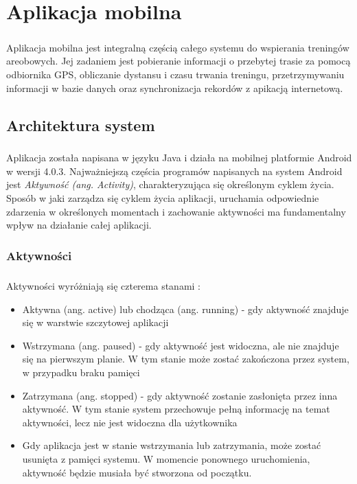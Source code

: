 \chapter{Aplikacja mobilna} %
\label{cha:aplikacja_mobilna}

\paragraph{} %
\label{par:}
Aplikacja mobilna jest integralną częścią całego systemu do wspierania treningów areobowych. Jej zadaniem jest pobieranie informacji o przebytej trasie za pomocą odbiornika GPS, obliczanie dystansu i czasu trwania treningu, przetrzymywaniu informacji w bazie danych oraz synchronizacja rekordów z apikacją internetową. 

\section{Architektura system} %
\label{sec:architektura_system}

\paragraph{} %
\label{par:}
Aplikacja została napisana w języku Java i działa na mobilnej platformie Android w wersji 4.0.3. Najważniejszą częścia programów napisanych na system Android jest \textit{Aktywność (ang. Activity)}, charakteryzująca się określonym cyklem życia. Sposób w jaki zarządza się cyklem życia aplikacji, uruchamia odpowiednie zdarzenia w określonych momentach i zachowanie aktywności ma fundamentalny wpływ na działanie całej aplikacji.

\subsection{Aktywności} %
\label{sub:aktywno_ci}

\paragraph{} %
\label{par:}
Aktywności wyróżniają się czterema stanami :
\begin{itemize}
	\item Aktywna (ang. active) lub chodząca (ang. running) - gdy aktywność znajduje się w warstwie szczytowej aplikacji
	\item Wstrzymana (ang. paused) - gdy aktywność jest widoczna, ale nie znajduje się na pierwszym planie. W tym stanie może zostać zakończona przez system, w przypadku braku pamięci
	\item Zatrzymana (ang. stopped) - gdy aktywność zostanie zasłonięta przez inna aktywność. W tym stanie system przechowuje pełną informację na temat aktywności, lecz nie jest widoczna dla użytkownika
	\item Gdy aplikacja jest w stanie wstrzymania lub zatrzymania, może zostać usunięta z pamięci systemu. W momencie ponownego uruchomienia, aktywność będzie musiała być stworzona od początku.
\end{itemize}

